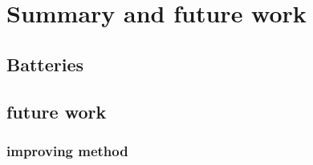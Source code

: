 \section{Summary and future work}
\subsection{Batteries}
\subsection{future work}
\subsubsection{improving method}
